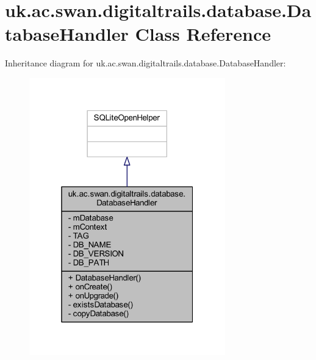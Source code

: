 \hypertarget{classuk_1_1ac_1_1swan_1_1digitaltrails_1_1database_1_1_database_handler}{\section{uk.\+ac.\+swan.\+digitaltrails.\+database.\+Database\+Handler Class Reference}
\label{classuk_1_1ac_1_1swan_1_1digitaltrails_1_1database_1_1_database_handler}
}


Inheritance diagram for uk.\+ac.\+swan.\+digitaltrails.\+database.\+Database\+Handler\+:
\nopagebreak
\begin{figure}[H]
\begin{center}
\leavevmode
\includegraphics[width=241pt]{classuk_1_1ac_1_1swan_1_1digitaltrails_1_1database_1_1_database_handler__inherit__graph}
\end{center}
\end{figure}



